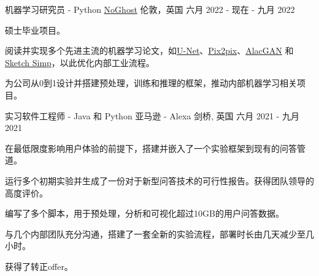 

\begin{cventries}

    \cventry
    {机器学习研究员 - Python} %
    {\href{https://www.noghost.co.uk/}{NoGhost}} %
    {伦敦，英国} %
    {六月 2022 - 现在 - 九月 2022} %
    {
      \begin{cvitems} %
        \item {硕士毕业项目。}
        \item {阅读并实现多个先进主流的机器学习论文，如\href{https://arxiv.org/abs/1505.04597}{U-Net}、\href{https://arxiv.org/pdf/1611.07004.pdf}{Pix2pix}、\href{https://arxiv.org/abs/1808.03240}{AlacGAN} 和 \href{https://esslab.jp/~ess/en/research/sketch/}{Sketch Simp}，以此优化内部工业流程。}
        \item {为公司从0到1设计并搭建预处理，训练和推理的框架，推动内部机器学习相关项目。}
      \end{cvitems}
    }


  \cventry
    {实习软件工程师 - Java 和 Python} %
    {亚马逊 - Alexa} %
    {剑桥, 英国} %
    {六月 2021 - 九月 2021} %
    {
      \begin{cvitems} %
        \item {在最低限度影响用户体验的前提下，搭建并嵌入了一个实验框架到现有的问答管道。}
        \item {运行多个初期实验并生成了一份对于新型问答技术的可行性报告。获得团队领导的高度评价。}
        \item {编写了多个脚本，用于预处理，分析和可视化超过10GB的用户问答数据。}
        \item {与几个内部团队充分沟通，搭建了一套全新的实验流程，部署时长由几天减少至几小时。}
        \item {获得了转正offer。}
      \end{cvitems}
    }


\end{cventries}
